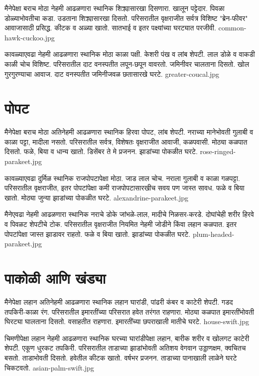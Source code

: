 \documentclass[aspectratio=169]{beamer}
\begin{document}
{मैनेपेक्षा बराच मोठा}
{नेहमी आढळणारा स्थानिक}
{शिक्र्यासारखा दिसणारा. खालून पट्टेदार. पिवळा डोळ्याभोवतीचा कडा. उडताना शिक्र्यासारखा दिसतो.}
{परिसरातील वृक्षराजीत सर्वत्र}
{विशिष्ट "ब्रेन-फीवर" आवाजासाठी प्रसिद्ध. कीटक व अळ्या खातो.}
{सातभाई व इतर पक्ष्यांच्या घरट्यात परजीवी.}
{common-hawk-cuckoo.jpg}

{कावळ्याएवढा}
{नेहमी आढळणारा स्थानिक}
{मोठा काळा पक्षी. केशरी पंख व लांब शेपटी. लाल डोळे व वाकडी काळी चोच विशिष्ट.}
{परिसरातील दाट वनस्पतीत}
{लपून-छपून वावरतो. जमिनीवर चालताना दिसतो. खोल गुरगुरण्याचा आवाज.}
{दाट वनस्पतीत जमिनीजवळ छतासारखे घरटे.}
{greater-coucal.jpg}

\section{पोपट}
{मैनेपेक्षा बराच मोठा}
{अतिनेहमी आढळणारा स्थानिक}
{हिरवा पोपट, लांब शेपटी. नराच्या मानेभोवती गुलाबी व काळा पट्टा, मादीला नसतो.}
{परिसरातील सर्वत्र, विशेषतः वृक्षराजीत}
{आवाजी, कळपवासी. मोठ्या कळपात दिसतो. फळे, बिया व धान्य खातो.}
{डिसेंबर ते मे प्रजनन. झाडांच्या पोकळीत घरटे.}
{rose-ringed-parakeet.jpg}

{कावळ्याएवढा}
{दुर्मिळ स्थानिक}
{राजपोपटापेक्षा मोठा. जाड लाल चोच. नराला गुलाबी व काळा गळपट्टा.}
{परिसरातील वृक्षराजीत, इतर पोपटांपेक्षा कमी}
{राजपोपटासारखीच सवय पण जास्त सावध. फळे व बिया खातो.}
{मोठ्या जुन्या झाडांच्या पोकळीत घरटे.}
{alexandrine-parakeet.jpg}

{मैनेएवढा}
{नेहमी आढळणारा स्थानिक}
{नराचे डोके जांभळे-लाल, मादीचे निळसर-करडे. दोघांचेही शरीर हिरवे व पिवळट शेपटीचे टोक.}
{परिसरातील वृक्षराजीत नियमित}
{नेहमी जोडीने किंवा लहान कळपात. इतर पोपटांपेक्षा जास्त झाडावर राहतो. फळे व बिया खातो.}
{झाडांच्या पोकळीत घरटे.}
{plum-headed-parakeet.jpg}

\section{पाकोळी आणि खंड्या}
{मैनेपेक्षा लहान}
{अतिनेहमी आढळणारा स्थानिक}
{लहान घारांडी, पांढरी कंबर व काटेरी शेपटी. गडद तपकिरी-काळा रंग.}
{परिसरातील इमारतींच्या परिसरात}
{हवेत तरंगत राहणारा. मोठ्या कळपात इमारतींभोवती घिरट्या घालताना दिसतो.}
{वसाहतीत राहणारा. इमारतींच्या छपराखाली मातीचे घरटे.}
{house-swift.jpg}

{चिमणीपेक्षा लहान}
{नेहमी आढळणारा स्थानिक}
{घरच्या घारांडीपेक्षा लहान, बारीक शरीर व खोलगट काटेरी शेपटी. एकूण धुरकट तपकिरी.}
{परिसरातील ताडाच्या झाडांभोवती}
{अतिशय वेगवान उड्डाणक्षम, क्वचितच बसतो. ताडाभोवती दिसतो. हवेतील कीटक खातो.}
{वर्षभर प्रजनन. ताडाच्या पानाखाली लाळेने घरटे चिकटवतो.}
{asian-palm-swift.jpg}
\end{document}
